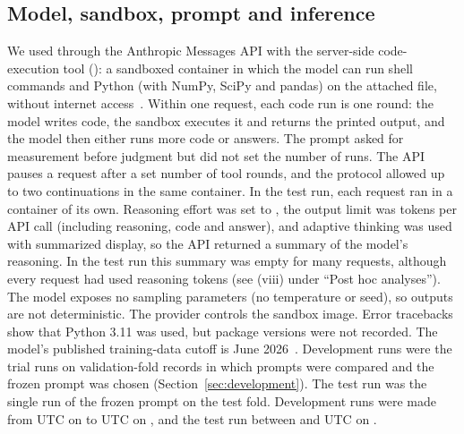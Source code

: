 \subsection{Model, sandbox, prompt and inference}\label{sec:inference}
We used \ModelID{} through the Anthropic Messages API with the server-side code-execution tool
(\CodeTool): a sandboxed container in which the model can run shell commands and Python (with NumPy, SciPy and pandas)
on the attached file, without internet access~\citep{anthropic2026codeexec}. Within one request, each code run is one round: the model
writes code, the sandbox executes it and returns the printed output, and the model then either runs more code or
answers. The prompt asked for measurement before judgment but did not set the number of runs. The API pauses a
request after a set number of tool rounds, and the protocol allowed up to two continuations in the same container. In the test run, each
request ran in a container of its own. Reasoning effort was set to \Effort{}, the output limit was \MaxTokens{} tokens per
API call (including reasoning, code and answer), and adaptive thinking was used with summarized display, so the API
returned a summary of the model's reasoning. In the test run this summary was empty for many requests, although every
request had used reasoning tokens (see (viii) under ``Post hoc analyses''). The model exposes no sampling parameters
(no temperature or seed), so outputs are not deterministic. The provider controls the sandbox image. Error tracebacks
show that Python 3.11 was used, but package versions were not recorded. The model's published training-data cutoff is June
2026~\citep{anthropic2026models}. Development runs were the trial runs on validation-fold records in which prompts were
compared and the frozen prompt was chosen (Section~\ref{sec:development}). The test run was the single run of the frozen
prompt on the test fold. Development runs were made from \DevFirstSubmitUTC{} UTC on
\DevFirstSubmitDateLong{} to \DevLastCollectUTC{} UTC on \DevLastCollectDateLong, and the test run between
\TestFirstSubmitUTC{} and \TestLastCollectUTC{} UTC on \TestRunDateLong.

